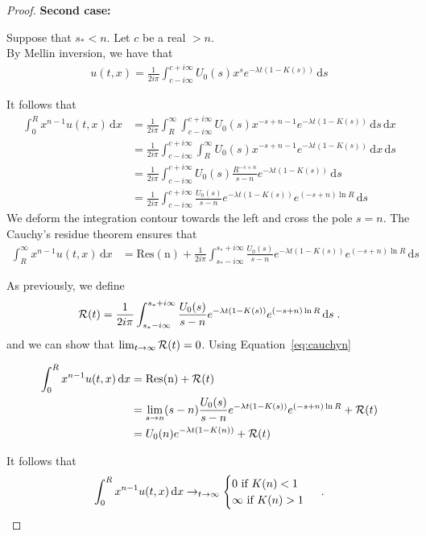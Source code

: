 \documentclass[11pt]{amsart}
\newcommand{\diff}{\,\mathrm{d}}
\begin{document}
\begin{proof}
\textbf{Second case:}

Suppose that $s_* < n$. Let $c$ be a real $>n$. \\
    By Mellin inversion, we have that
    \begin{align*}
        u(t,x) = \frac{1}{2i\pi}\int_{c-i\infty}^{c+i\infty} U_0(s) x^{s} e^{-\lambda t(1 - K(s))} \diff s
    \end{align*}

It follows that
\begin{align*}
    \int_0^R x^{n-1}u(t,x) \diff x 
    &= \frac{1}{2i\pi} \int_R^{\infty} \int_{c-i\infty}^{c+i\infty} U_0(s) x^{-s+n-1} e^{-\lambda t(1 - K(s))} \diff s \diff x \\
    &= \frac{1}{2i\pi} \int_{c-i\infty}^{c+i\infty} \int_R^{\infty} U_0(s) x^{-s+n-1} e^{-\lambda t(1 - K(s))} \diff x \diff s \\
    &= \frac{1}{2i\pi} \int_{c-i\infty}^{c+i\infty} U_0(s) \frac{R^{-s+n}}{s-n} e^{-\lambda t(1 - K(s))} \diff s \\
    &= \frac{1}{2i\pi} \int_{c-i\infty}^{c+i\infty} \frac{U_0(s)}{s-n} e^{-\lambda t(1 - K(s))} e^{(-s+n)\ln R} \diff s
\end{align*}
We deform the integration contour towards the left and cross the pole $s = n$. The Cauchy's residue theorem ensures that
\begin{align}
    \int_R^{\infty} x^{n-1}u(t,x) \diff x &= \mathrm{Res(n)} + \frac{1}{2i\pi} \int_{s_*-i\infty}^{s_*+i\infty} \frac{U_0(s)}{s-n} e^{-\lambda t(1 - K(s))} e^{(-s+n)\ln R} \diff s 
    \label{eq:cauchyn}
\end{align}


As previously, we define
\begin{align*}
    \Rcal(t) = \frac{1}{2i\pi} \int_{s_*-i\infty}^{s_*+i\infty} \frac{U_0(s)}{s-n} e^{-\lambda t(1 - K(s))} e^{(-s+n)\ln R} \diff s
    \eqfinp
\end{align*}
and we can show that $\lim_{t\to\infty}\mathcal{R}(t) = 0$. Using Equation~\ref{eq:cauchyn}


\begin{align*}
    \int_0^R x^{n-1}u(t,x) \diff x &= \mathrm{Res(n)} + \Rcal(t) \\
    &= \lim_{s \to n} (s-n)\frac{U_0(s)}{s-n} e^{-\lambda t(1 - K(s))} e^{(-s+n)\ln R}  + \Rcal(t)\\
    &= U_0(n)e^{-\lambda t(1 - K(n))} + \Rcal(t)\\
\end{align*}

It follows that 
\begin{equation}
    \int_0^R x^{n-1}u(t,x) \diff x \to_{t \to \infty}
    \begin{cases}
    0 \text{ if $K(n) < 1$}\\
    \infty \text{ if $K(n) > 1$}
    \end{cases}
    \eqfinp
\end{equation}

\end{proof}
\end{document}
